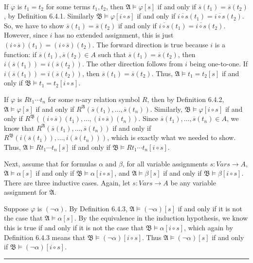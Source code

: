 \documentclass[11pt]{hmcpset}
\newenvironment{problem1}[1]{\noindent {\bf Problem #1}}
{\medskip}
\newenvironment{proof}{\noindent {\bf Proof:} \\}{\hfill
\rule{1mm}{3mm} \bigskip}
\begin{document}
\begin{problem1}{2. (a)}
\begin{proof}
If $\varphi$ is $t_1=t_2$ for some terms $t_1, t_2$, then $\mathfrak{A}\vDash\varphi [s]$ if and only if $\overline{s}(t_1)=\overline{s}(t_2)$, by Definition 6.4.1. Similarly $\mathfrak{B}\vDash\varphi [i\circ s]$ if and only if  $\overline{i \circ s}(t_1)=\overline{i \circ s}(t_2)$. So, we have to show $\overline{s}(t_1)=\overline{s}(t_2)$ if and only if $\overline{i \circ s}(t_1)=\overline{i \circ s}(t_2)$. However, since $i$ has no extended assignment, this is just $(i \circ\overline{ s})(t_1)=(i \circ \overline{s})(t_2)$. The forward direction is true because $i$ is a function: if $\overline{s}(t_1), \overline{s}(t_2) \in A$ such that $\overline{s}(t_1)=\overline{s}(t_2)$, then $i(\overline{s}(t_1))=i(\overline{s}(t_2))$. The other direction follows from $i$ being one-to-one. If $i(\overline{s}(t_1))=i(\overline{s}(t_2))$, then $\overline{s}(t_1)=\overline{s}(t_2)$. Thus, $\mathfrak{A}\vDash t_1=t_2 [s]$ if and only if $\mathfrak{B}\vDash t_1=t_2[i\circ s]$.

If $\varphi$ is $Rt_1\cdots t_n$ for some $n$-ary relation symbol $R$, then by Definition 6.4.2, $\mathfrak{A}\vDash\varphi [s]$ if and only if $R^{\mathfrak{A}}(\overline{s}(t_1),\ldots,\overline{s}(t_n))$. Similarly, $\mathfrak{B}\vDash\varphi [i\circ s]$ if and only if $R^{\mathfrak{B}}((i\circ\overline{s})(t_1),\ldots,(i\circ\overline{s})(t_n))$. Since $\overline{s}(t_1),\ldots,\overline{s}(t_n) \in A$, we know that $R^{\mathfrak{A}}(\overline{s}(t_1),\ldots,\overline{s}(t_n))$ if and only if $R^{\mathfrak{B}}(i(\overline{s}(t_1)),\ldots,i(\overline{s}(t_n)))$, which is exactly what we needed to show. Thus, $\mathfrak{A}\vDash Rt_1\cdots t_n[s]$ if and only if $\mathfrak{B}\vDash Rt_1\cdots t_n[i\circ s]$.

Next, assume that for formulas $\alpha$ and $\beta$, for all variable assignments $s:Vars\to A$, $\mathfrak{A}\vDash\alpha [s]$ if and only if $\mathfrak{B}\vDash\alpha [i \circ s]$, and $\mathfrak{A}\vDash\beta [s]$ if and only if $\mathfrak{B}\vDash\beta [i\circ s]$. There are three inductive cases. Again, let $s:Vars\to A$ be any variable assignment for $\mathfrak{A}$.

Suppose $\varphi$ is $(\neg\alpha)$. By Definition 6.4.3, $\mathfrak{A}\vDash(\neg\alpha) [s]$ if and only if it is not the case that $\mathfrak{A}\vDash\alpha [s]$. By the equivalence in the induction hypothesis, we know this is true if and only if it is not the case that $\mathfrak{B}\vDash\alpha [i\circ s]$, which again by Definition 6.4.3 means that $\mathfrak{B}\vDash (\neg\alpha ) [i \circ s]$. Thus $\mathfrak{A}\vDash(\neg\alpha) [s]$ if and only if $\mathfrak{B}\vDash(\neg\alpha) [i \circ s]$.


\end{proof}
\end{problem1}
\end{document}
